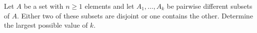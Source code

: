 Let $A$ be a set with $n\geq 1$ elements and let $A_1,\dots,A_k$ be pairwise different subsets of $A$.
Either two of these subsets are disjoint or one contains the other.
Determine the largest possible value of $k$.